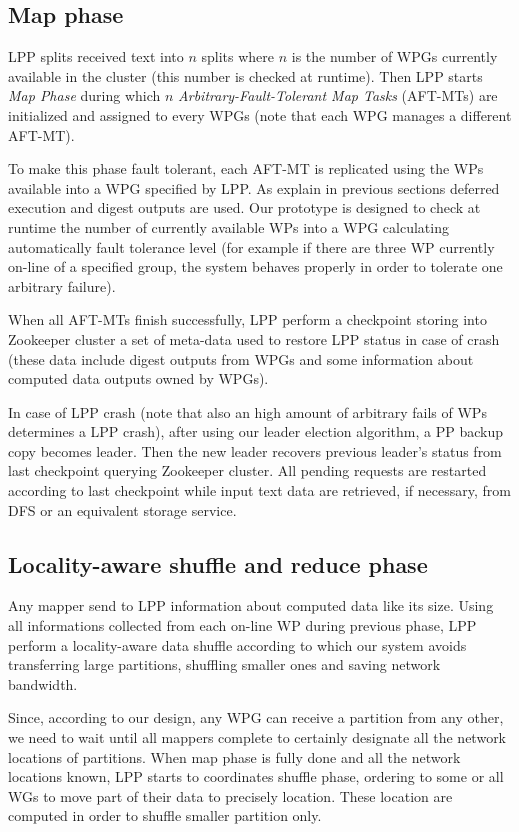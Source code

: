 \documentclass[sigchi]{acmart}
\begin{document}
\subsection{Map phase}

LPP splits received text into $n$ splits where $n$ is the number of WPGs currently available in the cluster (this number is checked at runtime). Then LPP starts \textit{Map Phase} during which $n$ \textit{Arbitrary-Fault-Tolerant Map Tasks} (AFT-MTs) are initialized and assigned to every WPGs (note that each WPG manages a different AFT-MT). 

To make this phase fault tolerant, each AFT-MT is replicated using the WPs available into a WPG specified by LPP. As explain in previous sections deferred execution and digest outputs are used. Our prototype is designed to check at runtime the number of currently available WPs into a WPG calculating automatically fault tolerance level (for example if there are three WP currently on-line of a specified group, the system behaves properly in order to tolerate one arbitrary failure).

When all AFT-MTs finish successfully, LPP perform a checkpoint storing into Zookeeper cluster a set of meta-data used to restore LPP status in case of crash (these data include digest outputs from WPGs and some information about computed data outputs owned by WPGs). 

In case of LPP crash (note that also an high amount of arbitrary fails of WPs determines a LPP crash), after using our leader election algorithm, a PP backup copy becomes leader. Then the new leader recovers previous leader's status from last checkpoint querying Zookeeper cluster. All pending requests are restarted according to last checkpoint while input text data are retrieved, if necessary, from DFS or an equivalent storage service. 

\subsection{Locality-aware shuffle and reduce phase}

Any mapper send to LPP information about computed data like its size. Using all informations collected from each on-line WP during previous phase, LPP perform a locality-aware data shuffle according to which our system avoids transferring large partitions, shuffling smaller ones and saving network bandwidth.

Since, according to our design, any WPG can receive a partition from any other, we need to wait until all mappers complete to certainly designate all the network locations of partitions. When map phase is fully done and all the network locations known, LPP starts to coordinates shuffle phase, ordering to some or all WGs to move part of their data to precisely location. These location are computed in order to shuffle smaller partition only. 
\end{document}
